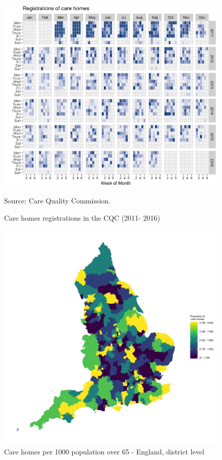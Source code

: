 \documentclass[12pt,letterpaper]{article}
\begin{document}
\begin{figure}[ht]
  \begin{minipage}{\textwidth}
\includegraphics[width=1\textwidth]{registrations.png}
\begin{flushright}
{\footnotesize Source: Care Quality Commission.\par}
\end{flushright}
\end{minipage}
\caption{Care homes registrations in the CQC (2011- 2016)}
\label{fig: registrations}
\end{figure}


\newpage

\begin{figure}[]
\includegraphics[width=1\textwidth]{map_carehomes.png}
\caption{Care homes per 1000 population over 65 - England, district level}
\label{fig: map care homes}
\end{figure}
\end{document}
